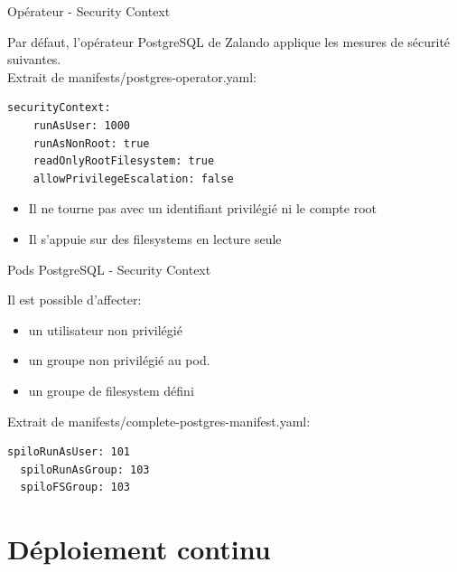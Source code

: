 \begin{frame}[fragile]{Opérateur - Security Context}

   Par défaut, l'opérateur PostgreSQL de Zalando applique les mesures de sécurité suivantes.\\
   Extrait de manifests/postgres-operator.yaml:

\begin{tiny}
\begin{Verbatim}[commandchars=\&\#\#]
securityContext:
    runAsUser: 1000
    runAsNonRoot: true
    readOnlyRootFilesystem: true
    allowPrivilegeEscalation: false
\end{Verbatim}
\end{tiny}

\begin{itemize}
   \item Il ne tourne pas avec un identifiant privilégié ni le compte root
   \item Il s'appuie sur des filesystems en lecture seule
\end{itemize}

\end{frame}


\begin{frame}[fragile]{Pods PostgreSQL - Security Context}

   Il est possible d'affecter:
\begin{itemize}
   \item un utilisateur non privilégié
   \item un groupe non privilégié au pod.
   \item un groupe de filesystem défini
\end{itemize}

   Extrait de manifests/complete-postgres-manifest.yaml:
\begin{tiny}
\begin{Verbatim}[commandchars=\&\@\@]
  spiloRunAsUser: 101
  spiloRunAsGroup: 103
  spiloFSGroup: 103
\end{Verbatim}
\end{tiny}

\end{frame}


\section{Déploiement continu}

